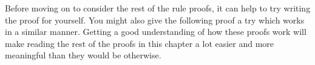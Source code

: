 Before moving on to consider the rest of the rule proofs, it can help to try writing the proof for yourself. 
You might also give the following proof a try which works in a similar manner.
Getting a good understanding of how these proofs work will make reading the rest of the proofs in this chapter a lot easier and more meaningful than they would be otherwise.

%




